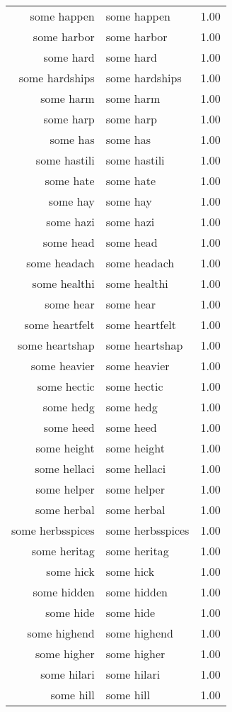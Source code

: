 \begin{table}[ht]
\begin{tabular}{rlr}
  some happen & some happen & 1.00 \\ 
  some harbor & some harbor & 1.00 \\ 
  some hard & some hard & 1.00 \\ 
  some hardships & some hardships & 1.00 \\ 
  some harm & some harm & 1.00 \\ 
  some harp & some harp & 1.00 \\ 
  some has & some has & 1.00 \\ 
  some hastili & some hastili & 1.00 \\ 
  some hate & some hate & 1.00 \\ 
  some hay & some hay & 1.00 \\ 
  some hazi & some hazi & 1.00 \\ 
  some head & some head & 1.00 \\ 
  some headach & some headach & 1.00 \\ 
  some healthi & some healthi & 1.00 \\ 
  some hear & some hear & 1.00 \\ 
  some heartfelt & some heartfelt & 1.00 \\ 
  some heartshap & some heartshap & 1.00 \\ 
  some heavier & some heavier & 1.00 \\ 
  some hectic & some hectic & 1.00 \\ 
  some hedg & some hedg & 1.00 \\ 
  some heed & some heed & 1.00 \\ 
  some height & some height & 1.00 \\ 
  some hellaci & some hellaci & 1.00 \\ 
  some helper & some helper & 1.00 \\ 
  some herbal & some herbal & 1.00 \\ 
  some herbsspices & some herbsspices & 1.00 \\ 
  some heritag & some heritag & 1.00 \\ 
  some hick & some hick & 1.00 \\ 
  some hidden & some hidden & 1.00 \\ 
  some hide & some hide & 1.00 \\ 
  some highend & some highend & 1.00 \\ 
  some higher & some higher & 1.00 \\ 
  some hilari & some hilari & 1.00 \\ 
  some hill & some hill & 1.00 \\ 

\end{tabular}
\end{table}
